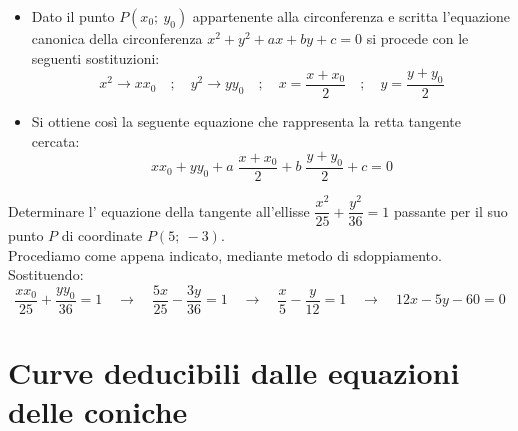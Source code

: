 \begin{itemize} [noitemsep]
  \item  Dato il punto $P( x_{0};~ y_{0} )$ appartenente alla 
circonferenza e scritta l'equazione canonica della circonferenza $ x^{2} + 
y^{2} +ax+by+c=0$ si procede con le seguenti sostituzioni:
\[ x^{2} \longrightarrow x x_{0}  \quad ;\quad y^{2} \longrightarrow y y_{0}\quad ;\quad
x= \dfrac{x+x_{0}}{2} \quad ;\quad y= \dfrac{y+y_{0}}{2}\]

  \item Si ottiene così la seguente equazione che rappresenta la retta 
tangente cercata:
 \[x x_{0} +y y_{0}+a\; \dfrac{x+x_{0}}{2}  +b\; \dfrac{y+y_{0}}{2} +c=0\]
\end{itemize}

\begin{esempio} Determinare l' equazione della tangente 
all'ellisse $ \dfrac{x^{2}}{25}+\dfrac{y^{2}}{36} =1$ passante per il suo 
punto $P$ di coordinate $P\left(5;~-3\right)$.\\[7pt] 
Procediamo come appena indicato, mediante metodo di sdoppiamento. Sostituendo:
\[\dfrac{xx_{0}}{25} + \dfrac{yy_{0}}{36} = 1 \quad \rightarrow \quad
\dfrac{5x}{25} - \dfrac{3y}{36} =1 \quad \rightarrow \quad 
\dfrac{x}{5}-\dfrac{y}{12}=1\quad \rightarrow \quad 12x-5y-60=0\]
\end{esempio}

\section{Curve deducibili dalle equazioni delle coniche}
\label{sec:coniche_curve_deducibili}

